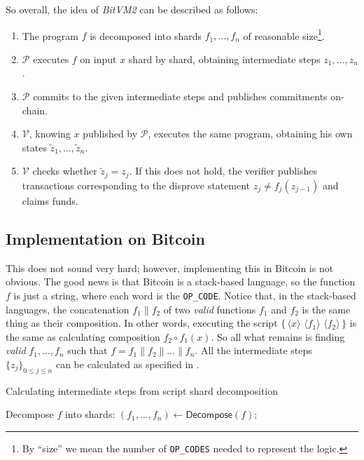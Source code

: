 \documentclass{iacrtrans}
\newcommand{\elem}[1]{\, \langle #1 \rangle \,}
\newcommand{\script}[1]{ $\big\{ #1 \big\}$ }
\begin{document}
So overall, the idea of \textit{BitVM2} can be described as follows:
\begin{enumerate}
    \item The program $f$ is decomposed into shards $f_1,\dots,f_n$ of
    reasonable size\footnote{By ``size'' we mean the number of
    \texttt{OP\_CODES} needed to represent the logic.}.
    \item $\mathcal{P}$ executes $f$ on input ${x}$ shard by shard, obtaining
    intermediate steps ${z}_1,\dots,{z}_n$.
    \item $\mathcal{P}$ commits to the given intermediate steps and publishes
    commitments on-chain.
    \item $\mathcal{V}$, knowing ${x}$ published by $\mathcal{P}$, executes the
    same program, obtaining his own states
    $\widetilde{z}_1,\dots,\widetilde{z}_n$.
    \item $\mathcal{V}$ checks whether $\widetilde{z}_j = z_j$. If this does not
    hold, the verifier publishes transactions corresponding to the disprove
    statement $z_j \neq f_j(z_{j-1})$ and claims funds.
\end{enumerate}

\subsection{Implementation on Bitcoin}

This does not sound very hard; however, implementing this in Bitcoin is not
obvious. The good news is that Bitcoin is a stack-based language, so the
function $f$ is just a string, where each word is the \texttt{OP\_CODE}. Notice
that, in the stack-based languages, the concatenation $f_1 \parallel f_2$ of two
\textit{valid} functions $f_1$ and $f_2$ is the same thing as their composition.
In other words, executing the script \script{\elem{x} \elem{f_1} \elem{f_2}} is
the same as calculating composition $f_2 \circ f_1(x)$. So all what remains is
finding \textit{valid} $f_1,\dots,f_n$ such that $f = f_1 \parallel f_{2}
\parallel \dots \parallel f_n$. All the intermediate steps $\{z_j\}_{0 \leq j
\leq n}$ can be calculated as specified in .

\begin{algorithm}[H]
\caption{Calculating intermediate steps from script shard decomposition}

Decompose $f$ into shards: $(f_1,\dots,f_n) \gets \mathsf{Decompose}(f)$;

\For{$i \in \{1,\dots,n\}$}{
    $z_i \gets \mathsf{Exec}(\{\elem{z_{i-1}} \elem{f_i}\})$;
}

\label{alg:intermediate_steps}
\end{algorithm}
\end{document}
